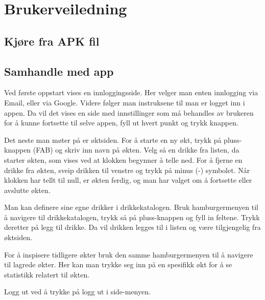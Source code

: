 \section{Brukerveiledning}
\subsection{Kjøre fra APK fil}

\subsection{Samhandle med app}
Ved første oppstart vises en innloggingsside. Her velger man enten innlogging via Email, eller via Google. Videre følger man instruksene til man er logget inn i appen. Da vil det vises en side med innstillinger som må behandles av brukeren for å kunne fortsette til selve appen, fyll ut hvert punkt og trykk knappen.

Det neste man møter på er øktsiden. For å starte en ny økt, trykk på pluss-knappen (FAB) og skriv inn navn på økten. Velg så en drikke fra listen, da starter økten, som vises ved at klokken begynner å telle ned. For å fjerne en drikke fra økten, sveip drikken til venstre og trykk på minus (-) symbolet. Når klokken har tellt til null, er økten ferdig, og man har valget om å fortsette eller avslutte økten.

Man kan definere sine egne drikker i drikkekatalogen. Bruk hamburgermenyen til å navigere til drikkekatalogen, trykk så på pluss-knappen og fyll in feltene. Trykk deretter på legg til drikke. Da vil drikken legges til i listen og være tilgjengelig fra øktsiden.

For å inspisere tidligere økter bruk den samme hamburgermenyen til å navigere til lagrede økter. Her kan man trykke seg inn på en spesifikk økt for å se statistikk relatert til økten.

Logg ut ved å trykke på logg ut i side-menyen.
